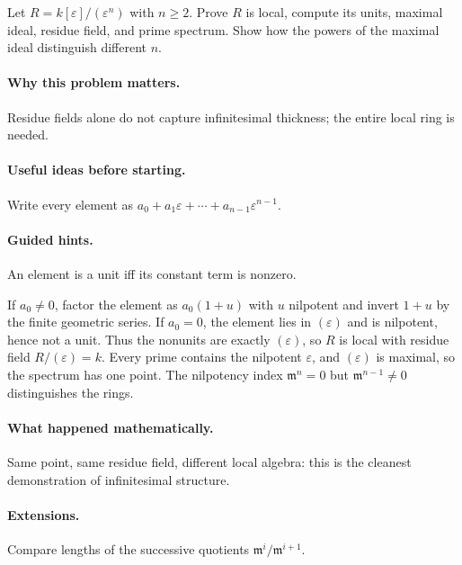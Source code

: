 \begin{problem}
Let $R=k[\varepsilon]/(\varepsilon^n)$ with $n\ge2$.  Prove $R$ is local, compute its units, maximal ideal, residue field, and prime spectrum.  Show how the powers of the maximal ideal distinguish different $n$.
\end{problem}

\paragraph{Why this problem matters.}
Residue fields alone do not capture infinitesimal thickness; the entire local ring is needed.

\paragraph{Useful ideas before starting.}
Write every element as $a_0+a_1\varepsilon+\cdots+a_{n-1}\varepsilon^{n-1}$.

\paragraph{Guided hints.}
An element is a unit iff its constant term is nonzero.

\begin{solution}
If $a_0\neq0$, factor the element as $a_0(1+u)$ with $u$ nilpotent and invert $1+u$ by the finite geometric series.  If $a_0=0$, the element lies in $(\varepsilon)$ and is nilpotent, hence not a unit.  Thus the nonunits are exactly $(\varepsilon)$, so $R$ is local with residue field $R/(\varepsilon)=k$.  Every prime contains the nilpotent $\varepsilon$, and $(\varepsilon)$ is maximal, so the spectrum has one point.  The nilpotency index $\mathfrak m^n=0$ but $\mathfrak m^{n-1}\neq0$ distinguishes the rings.
\end{solution}

\paragraph{What happened mathematically.}
Same point, same residue field, different local algebra: this is the cleanest demonstration of infinitesimal structure.

\paragraph{Extensions.}
Compare lengths of the successive quotients $\mathfrak m^i/\mathfrak m^{i+1}$.
